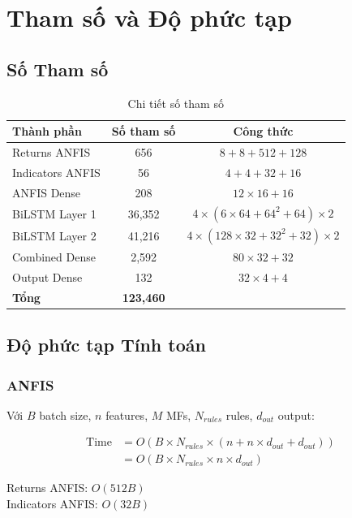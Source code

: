 \documentclass[12pt,a4paper]{article}
\begin{document}
\section{Tham số và Độ phức tạp}

\subsection{Số Tham số}

\begin{table}[h]
\centering
\caption{Chi tiết số tham số}
\begin{tabular}{lcc}
\toprule
\textbf{Thành phần} & \textbf{Số tham số} & \textbf{Công thức} \\
\midrule
Returns ANFIS & 656 & $8+8+512+128$ \\
Indicators ANFIS & 56 & $4+4+32+16$ \\
ANFIS Dense & 208 & $12 \times 16 + 16$ \\
BiLSTM Layer 1 & 36,352 & $4 \times (6 \times 64 + 64^2 + 64) \times 2$ \\
BiLSTM Layer 2 & 41,216 & $4 \times (128 \times 32 + 32^2 + 32) \times 2$ \\
Combined Dense & 2,592 & $80 \times 32 + 32$ \\
Output Dense & 132 & $32 \times 4 + 4$ \\
\midrule
\textbf{Tổng} & \textbf{123,460} & \\
\bottomrule
\end{tabular}
\end{table}

\subsection{Độ phức tạp Tính toán}

\subsubsection{ANFIS}

Với $B$ batch size, $n$ features, $M$ MFs, $N_{rules}$ rules, $d_{out}$ output:

\begin{align}
\text{Time} &= O(B \times N_{rules} \times (n + n \times d_{out} + d_{out})) \\
&= O(B \times N_{rules} \times n \times d_{out})
\end{align}

Returns ANFIS: $O(512B)$ \\
Indicators ANFIS: $O(32B)$
\end{document}
